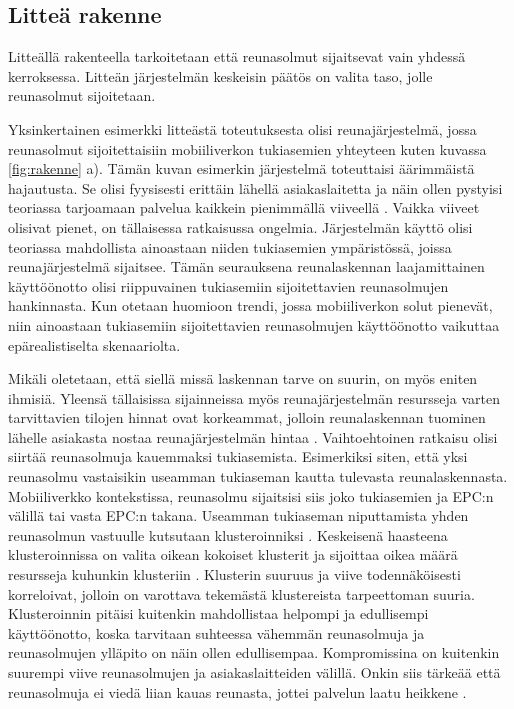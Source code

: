 \subsection{Litteä rakenne}
Litteällä rakenteella tarkoitetaan että reunasolmut sijaitsevat vain yhdessä kerroksessa. Litteän järjestelmän keskeisin päätös on valita taso, jolle reunasolmut sijoitetaan.

Yksinkertainen esimerkki litteästä toteutuksesta olisi reunajärjestelmä, jossa reunasolmut sijoitettaisiin mobiiliverkon tukiasemien yhteyteen kuten kuvassa \ref{fig:rakenne} a). Tämän kuvan esimerkin järjestelmä  toteuttaisi äärimmäistä hajautusta. Se olisi fyysisesti erittäin lähellä asiakaslaitetta ja näin ollen pystyisi teoriassa tarjoamaan palvelua kaikkein pienimmällä viiveellä \cite{mach17mobile}.
Vaikka viiveet olisivat pienet, on tällaisessa ratkaisussa ongelmia.
Järjestelmän käyttö olisi teoriassa mahdollista ainoastaan niiden tukiasemien ympäristössä, joissa reunajärjestelmä sijaitsee. Tämän seurauksena reunalaskennan laajamittainen käyttöönotto olisi riippuvainen tukiasemiin sijoitettavien reunasolmujen hankinnasta. Kun otetaan huomioon trendi, jossa mobiiliverkon solut pienevät, niin ainoastaan tukiasemiin sijoitettavien reunasolmujen käyttöönotto vaikuttaa epärealistiselta skenaariolta.

Mikäli oletetaan, että siellä missä laskennan tarve on suurin, on myös eniten ihmisiä. Yleensä tällaisissa sijainneissa myös reunajärjestelmän resursseja varten tarvittavien tilojen hinnat ovat korkeammat, jolloin reunalaskennan tuominen lähelle asiakasta nostaa reunajärjestelmän hintaa \cite{mao17}.
Vaihtoehtoinen ratkaisu olisi siirtää reunasolmuja kauemmaksi tukiasemista. Esimerkiksi siten, että yksi reunasolmu vastaisikin useamman tukiaseman kautta tulevasta reunalaskennasta.
Mobiiliverkko kontekstissa, reunasolmu sijaitsisi siis joko tukiasemien ja EPC:n välillä tai vasta EPC:n takana.  
Useamman tukiaseman niputtamista yhden reunasolmun vastuulle kutsutaan klusteroinniksi \cite{RefWorks:doc:59d4b224e4b015703b881ab9}. 
Keskeisenä haasteena klusteroinnissa on valita oikean kokoiset klusterit ja sijoittaa oikea määrä resursseja kuhunkin klusteriin \cite{malandrino2016close}.
Klusterin suuruus ja viive todennäköisesti korreloivat, jolloin on varottava tekemästä klustereista tarpeettoman suuria.
Klusteroinnin pitäisi kuitenkin mahdollistaa helpompi ja edullisempi käyttöönotto, koska tarvitaan suhteessa vähemmän reunasolmuja ja reunasolmujen ylläpito on näin ollen edullisempaa.
Kompromissina on kuitenkin suurempi viive reunasolmujen ja asiakaslaitteiden välillä. 
Onkin siis tärkeää että reunasolmuja ei viedä liian kauas reunasta, jottei palvelun laatu heikkene \cite{mao17}. 


